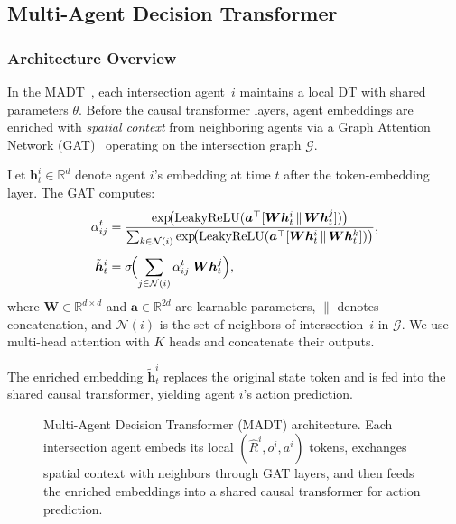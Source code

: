\documentclass[journal]{IEEEtran}
\newcommand{\R}{\mathbb{R}}
\newcommand{\Rtg}{\widehat{R}}
\begin{document}
\subsection{Multi-Agent Decision Transformer}
\label{sec:method:madt}

\subsubsection{Architecture Overview}
In the MADT~\cite{su2026madt}, each intersection agent~$i$ maintains a
local DT with shared parameters $\theta$.  Before the causal
transformer layers, agent embeddings are enriched with
\emph{spatial context} from neighboring agents via a Graph Attention
Network (GAT)~\cite{velickovic2018graph} operating on the intersection
graph $\mathcal{G}$.

Let $\bm{h}_t^i \in \R^d$ denote agent $i$'s embedding at time $t$
after the token-embedding layer.  The GAT computes:
\begin{align}
  \alpha_{ij}^t &= \frac{
    \exp\!\bigl(\text{LeakyReLU}(\bm{a}^\top
    [\bm{W}\bm{h}_t^i \,\|\, \bm{W}\bm{h}_t^j])\bigr)
  }{
    \sum_{k \in \mathcal{N}(i)}
    \exp\!\bigl(\text{LeakyReLU}(\bm{a}^\top
    [\bm{W}\bm{h}_t^i \,\|\, \bm{W}\bm{h}_t^k])\bigr)
  }, \label{eq:gat_attn} \\[4pt]
  \tilde{\bm{h}}_t^i &= \sigma\!\Bigl(
    \sum_{j \in \mathcal{N}(i)} \alpha_{ij}^t\;\bm{W}\bm{h}_t^j
  \Bigr), \label{eq:gat_agg}
\end{align}
where $\bm{W} \in \R^{d \times d}$ and $\bm{a} \in \R^{2d}$ are
learnable parameters, $\|$ denotes concatenation, and
$\mathcal{N}(i)$ is the set of neighbors of intersection~$i$ in
$\mathcal{G}$.  We use multi-head attention with $K$ heads and
concatenate their outputs.

The enriched embedding $\tilde{\bm{h}}_t^i$ replaces the original
state token and is fed into the shared causal transformer, yielding
agent $i$'s action prediction.

\begin{figure}[t]
  \centering
  \caption{Multi-Agent Decision Transformer (MADT) architecture.
    Each intersection agent embeds its local $(\Rtg^i, o^i, a^i)$
    tokens, exchanges spatial context with neighbors through GAT
    layers, and then feeds the enriched embeddings into a shared
    causal transformer for action prediction.}
  \label{fig:madt_arch}
\end{figure}
\end{document}
